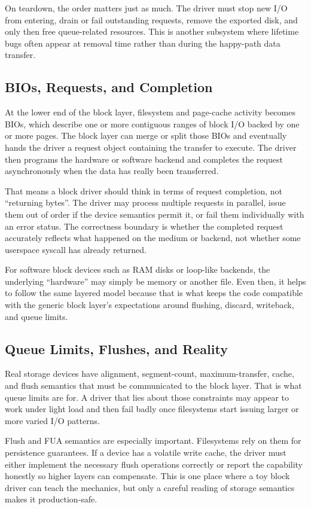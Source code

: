 \documentclass[10pt, oneside]{book}
\begin{document}
On teardown, the order matters just as much.
The driver must stop new I/O from entering, drain or fail outstanding requests,
remove the exported disk, and only then free queue-related resources.
This is another subsystem where lifetime bugs often appear at removal time
rather than during the happy-path data transfer.

\subsection{BIOs, Requests, and Completion}
\label{sec:block_io_path}
At the lower end of the block layer, filesystem and page-cache activity becomes
BIOs, which describe one or more contiguous ranges of block I/O backed by one
or more pages.
The block layer can merge or split those BIOs and eventually hands the driver a
request object containing the transfer to execute.
The driver then programs the hardware or software backend and completes the
request asynchronously when the data has really been transferred.

That means a block driver should think in terms of request completion, not
``returning bytes''.
The driver may process multiple requests in parallel, issue them out of order if
the device semantics permit it, or fail them individually with an error status.
The correctness boundary is whether the completed request accurately reflects
what happened on the medium or backend, not whether some userspace syscall has
already returned.

For software block devices such as RAM disks or loop-like backends, the
underlying ``hardware'' may simply be memory or another file.
Even then, it helps to follow the same layered model because that is what keeps
the code compatible with the generic block layer's expectations around flushing,
discard, writeback, and queue limits.

\subsection{Queue Limits, Flushes, and Reality}
\label{sec:block_limits}
Real storage devices have alignment, segment-count, maximum-transfer, cache, and
flush semantics that must be communicated to the block layer.
That is what queue limits are for.
A driver that lies about those constraints may appear to work under light load
and then fail badly once filesystems start issuing larger or more varied I/O
patterns.

Flush and FUA semantics are especially important.
Filesystems rely on them for persistence guarantees.
If a device has a volatile write cache, the driver must either implement the
necessary flush operations correctly or report the capability honestly so higher
layers can compensate.
This is one place where a toy block driver can teach the mechanics, but only a
careful reading of storage semantics makes it production-safe.
\end{document}
